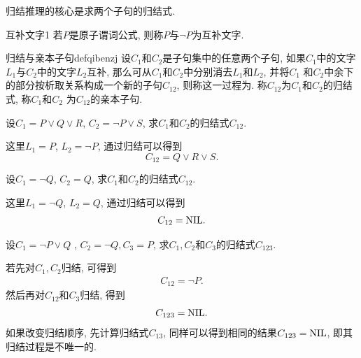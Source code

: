 归结推理的核心是求两个子句的归结式.
\begin{mydef}{互补文字}{1}
    若$P$是原子谓词公式, 则称$P$与$\neg P$为互补文字.
\end{mydef}
\begin{mydef}{归结与亲本子句}{defqibenzj}
    设$C_1$和$C_2$是子句集中的任意两个子句, 如果$C_1$中的文字$L_1$与$C_2$中的文字$L_2$互补, 那么可从$C_1$和$C_2$中分别消去$L_1$和$L_2$, 并将$C_1$ 和$C_2$中余下的部分按析取关系构成一个新的子句$C_{12}$, 则称这一过程为.
    称$C_{12}$为$C_1$和$C_2$的归结式, 称$C_1$和$C_2$ 为$C_{1 2}$的亲本子句.
\end{mydef}
\begin{example}
    设$C_1 =P\vee Q\vee R$, $C_2=\neg P\vee S$, 求$C_1$和$C_2$的归结式$C_{12}$.
\end{example}
\begin{result}
这里$L_1=P$, $L_2=\neg P$, 通过归结可以得到
             $$C_{12}= Q\vee R\vee S.$$
\begin{example}
    设$C_1=\neg Q$, $C_2=Q$, 求$C_1$和$C_2$的归结式$C_{12}$.
\end{example}
\end{result}
\begin{result}
    这里$L_1=\neg Q$, $L_2=Q$, 通过归结可以得到
\begin{align}
    C_{12}= \textup{NIL}.
\end{align}
\end{result}
\begin{example}
    设$C_1  =\neg P \vee  Q$ , $C_2 =\neg Q,C_3=P$, 求$C_1,C_2$和$C_3$的归结式$C_{123}$.
\end{example}
\begin{result}
    若先对$C_1,C_2$归结, 可得到
\begin{align}
    C_{1 2}=\neg P.
\end{align}
然后再对$C_{12}$和$C_3$归结, 得到
\begin{align}
    C_{123}=\textup{NIL}.
\end{align}
如果改变归结顺序, 先计算归结式$C_{13}$, 同样可以得到相同的结果$C_{123}=\textup{NIL}$, 即其归结过程是不唯一的.
\end{result}
